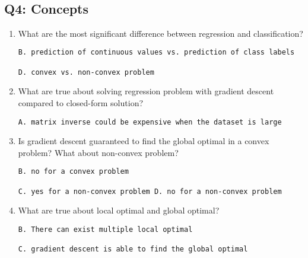 \documentclass[11pt]{article}
\begin{document}
    \begin{center}
    \end{center}
    { \hspace*{\fill} \\}
    
    \subsection{Q4: Concepts}\label{q4-concepts}

\begin{enumerate}
\def\labelenumi{\arabic{enumi}.}
\item
  What are the most significant difference between regression and
  classification?

\begin{verbatim}
B. prediction of continuous values vs. prediction of class labels

D. convex vs. non-convex problem
\end{verbatim}
\item
  What are true about solving regression problem with gradient descent
  compared to closed-form solution?

\begin{verbatim}
A. matrix inverse could be expensive when the dataset is large
\end{verbatim}
\item
  Is gradient descent guaranteed to find the global optimal in a convex
  problem? What about non-convex problem?

\begin{verbatim}
B. no for a convex problem

C. yes for a non-convex problem D. no for a non-convex problem
\end{verbatim}
\item
  What are true about local optimal and global optimal?

\begin{verbatim}
B. There can exist multiple local optimal

C. gradient descent is able to find the global optimal 
\end{verbatim}
\end{enumerate}


    
    
    
    
\end{document}

